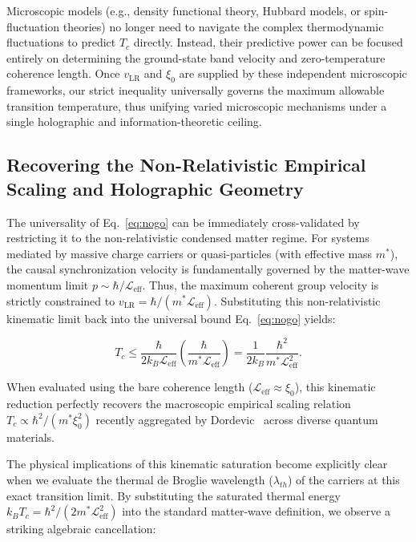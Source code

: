 \documentclass[11pt,a4paper]{article}
\begin{document}
Microscopic models (e.g., density functional theory, Hubbard models, or spin-fluctuation theories) no longer need to navigate the complex thermodynamic fluctuations to predict $T_c$ directly. Instead, their predictive power can be focused entirely on determining the ground-state band velocity and zero-temperature coherence length. Once $v_{\text{LR}}$ and $\xi_0$ are supplied by these independent microscopic frameworks, our strict inequality universally governs the maximum allowable transition temperature, thus unifying varied microscopic mechanisms under a single holographic and information-theoretic ceiling.

\subsection*{Recovering the Non-Relativistic Empirical Scaling and Holographic Geometry}

The universality of Eq.~\eqref{eq:nogo} can be immediately cross-validated by restricting it to the non-relativistic condensed matter regime. For systems mediated by massive charge carriers or quasi-particles (with effective mass $m^*$), the causal synchronization velocity is fundamentally governed by the matter-wave momentum limit $p \sim \hbar / \mathcal{L}_{\text{eff}}$. Thus, the maximum coherent group velocity is strictly constrained to $v_{\text{LR}} = \hbar / (m^* \mathcal{L}_{\text{eff}})$. Substituting this non-relativistic kinematic limit back into the universal bound Eq.~\eqref{eq:nogo} yields:

$$T_c \le \frac{\hbar}{2k_B \mathcal{L}_{\text{eff}}} \left( \frac{\hbar}{m^* \mathcal{L}_{\text{eff}}} \right) = \frac{1}{2k_B} \frac{\hbar^2}{m^* \mathcal{L}_{\text{eff}}^2}.$$

\label{eq:dordevic_recover}

When evaluated using the bare coherence length ($\mathcal{L}_{\text{eff}} \approx \xi_0$), this kinematic reduction perfectly recovers the macroscopic empirical scaling relation $T_c \propto \hbar^2 / (m^* \xi_0^2)$ recently aggregated by Dordevic~\cite{Dordevic2025} across diverse quantum materials.

The physical implications of this kinematic saturation become explicitly clear when we evaluate the thermal de Broglie wavelength ($\lambda_{th}$) of the carriers at this exact transition limit. By substituting the saturated thermal energy $k_B T_c = \hbar^2 / (2m^*\mathcal{L}_{\text{eff}}^2)$ into the standard matter-wave definition, we observe a striking algebraic cancellation:
\end{document}
